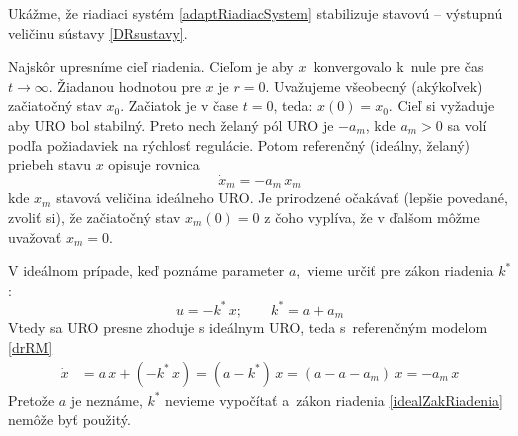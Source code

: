 \documentclass[a4paper, 10pt, ]{article}
\begin{document}
Ukážme, že riadiaci systém \eqref{adaptRiadiacSystem} stabilizuje stavovú -- výstupnú veličinu sústavy \eqref{DRsustavy}.

Najskôr upresníme cieľ riadenia. Cieľom je aby $x$~konvergovalo k~nule pre čas $t\rightarrow\infty$. Žiadanou hodnotou pre $x$ je $r=0$. Uvažujeme všeobecný (akýkoľvek) začiatočný stav $x_0$. Začiatok je v čase $t = 0$, teda: $x(0) = x_0$. Cieľ si vyžaduje aby URO bol stabilný. Preto nech želaný pól URO je $-a_m$, kde $a_m>0$ sa volí podľa požiadaviek na rýchlosť regulácie. Potom referenčný (ideálny, želaný) priebeh stavu $x$ opisuje rovnica
\begin{equation} \label{drRM}
	\dot{x}_m = -a_m\, x_m
\end{equation}
kde $x_m$ stavová veličina ideálneho URO. Je prirodzené očakávať (lepšie povedané, zvoliť si), že začiatočný stav $x_m(0) = 0$ z čoho vyplíva, že v ďalšom môžme uvažovať $x_m = 0$.

V ideálnom prípade, keď poznáme parameter $a$,~vieme určiť  pre zákon riadenia  $k^*$:
\begin{equation} \label{idealZakRiadenia}
	u = -k^* \, x; \qquad k^* = a + a_m
\end{equation}
Vtedy sa URO presne zhoduje s ideálnym URO, teda s~referenčným modelom \eqref{drRM}
\begin{equation}
	\begin{split}
		\dot{x} &= a\, x + \left( -k^* \, x \right) = \left(a - k^* \right)\,x = \left(a - a - a_m \right)\,x  =- a_m\,x
	\end{split}
\end{equation}
Pretože $a$ je neznáme, $k^*$ nevieme vypočítať a~zákon riadenia \eqref{idealZakRiadenia} nemôže byť použitý.
\end{document}
